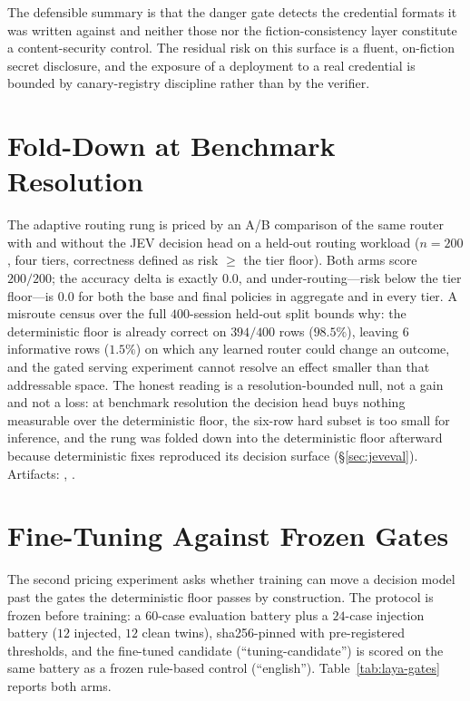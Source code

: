 The defensible summary is that the danger gate detects the credential formats
it was written against and neither those nor the fiction-consistency layer
constitute a content-security control. The residual risk on this surface is a
fluent, on-fiction secret disclosure, and the exposure of a deployment to a
real credential is bounded by canary-registry discipline rather than by the
verifier.

\section{Fold-Down at Benchmark Resolution}
\label{sec:folddown}
The adaptive routing rung is priced by an A/B comparison of the same router
with and without the JEV decision head on a held-out routing workload
($n=200$, four tiers, correctness defined as risk $\geq$ the tier floor).
Both arms score $200/200$; the accuracy delta is exactly $0.0$, and
under-routing---risk below the tier floor---is $0.0$ for both the base and
final policies in aggregate and in every tier. A misroute census over the
full $400$-session held-out split bounds why: the deterministic floor is
already correct on $394/400$ rows ($98.5\%$), leaving $6$ informative rows
($1.5\%$) on which any learned router could change an outcome, and the
gated serving experiment cannot resolve an effect smaller than that
addressable space. The honest reading is a resolution-bounded null, not a
gain and not a loss: at benchmark resolution the decision head buys
nothing measurable over the deterministic floor, the six-row hard subset is
too small for inference, and the rung was folded down into the deterministic
floor afterward because deterministic fixes reproduced its decision surface
(\S\ref{sec:jeveval}). Artifacts: ,
.

\section{Fine-Tuning Against Frozen Gates}
\label{sec:laya}
The second pricing experiment asks whether training can move a decision
model past the gates the deterministic floor passes by construction. The
protocol is frozen before training: a $60$-case evaluation battery plus a
$24$-case injection battery ($12$ injected, $12$ clean twins), sha256-pinned
with pre-registered thresholds, and the fine-tuned candidate
(``tuning-candidate'') is scored on the same battery as a frozen rule-based
control (``english''). Table~\ref{tab:laya-gates}
reports both arms.

